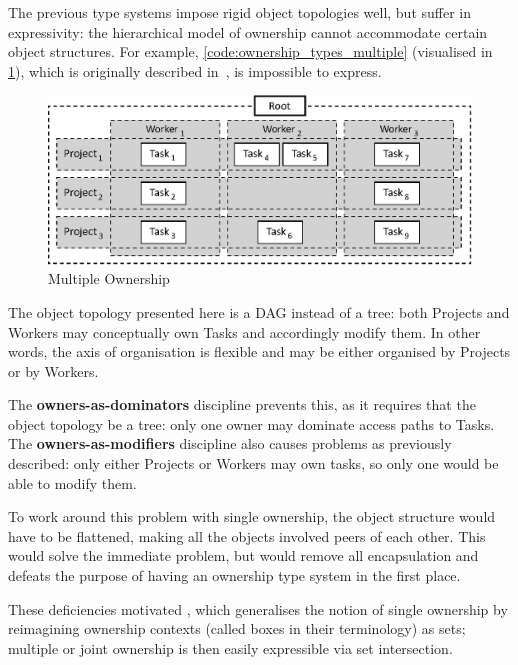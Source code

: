 \documentclass{acm_proc_article-sp}
\begin{document}
The previous type systems impose rigid object topologies well, but suffer in
expressivity: the hierarchical model of ownership cannot accommodate certain
object structures. For example, \cref{code:ownership_types_multiple}
(visualised in \cref{fig:multiple-ownership}), which is originally described
in~\cite{cameron07mojo}, is impossible to express.

\begin{figure}[t]
\centering
\includegraphics{multiple-ownership.eps}
\caption{Multiple Ownership}
\label{fig:multiple-ownership}
\end{figure}

The object topology presented here is a DAG instead of a tree: both Projects and
Workers may conceptually own Tasks and accordingly modify them. In other words,
the axis of organisation is flexible and may be either organised by Projects or
by Workers.

The \textbf{owners-as-dominators} discipline prevents this, as it requires that
the object topology be a tree: only one owner may dominate access paths to
Tasks. The \textbf{owners-as-modifiers} discipline also causes problems as
previously described: only either Projects or Workers may own tasks, so only
one would be able to modify them.



To work around this problem with single ownership, the object structure would
have to be flattened, making all the objects involved peers of each other. This
would solve the immediate problem, but would remove all encapsulation and
defeats the purpose of having an ownership type system in the first place.

These deficiencies motivated \cite{cameron07mojo}, which generalises the notion
of single ownership by reimagining ownership contexts (called boxes in their
terminology) as sets; multiple or joint ownership is then easily expressible via
set intersection.
\end{document}
